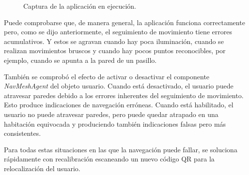 \documentclass{article}
\newenvironment{standalone}{\begin{preview}}{\end{preview}}
\begin{document}
\begin{standalone}
\begin{figure}[ht!]
    \caption{Captura de la aplicación en ejecución.}
    \label{fig:capturas}
  \end{figure}

  Puede comprobarse que, de manera general, la aplicación funciona correctamente pero, como se dijo anteriormente, el seguimiento de movimiento tiene errores acumulativos.
  Y estos se agravan cuando hay poca iluminación, cuando se realizan movimientos bruscos y cuando hay pocos puntos reconocibles, por ejemplo, cuando se apunta a la pared de un pasillo.

  También se comprobó el efecto de activar o desactivar el componente \textit{NavMeshAgent} del objeto usuario.
  Cuando está desactivado, el usuario puede atravesar paredes debido a los errores inherentes del seguimiento de movimiento.
  Esto produce indicaciones de navegación erróneas.
  Cuando está habilitado, el usuario no puede atravesar paredes, pero puede quedar atrapado en una habitación equivocada y produciendo también indicaciones falsas pero más consistentes.

  Para todas estas situaciones en las que la navegación puede fallar, se soluciona rápidamente con recalibración escaneando un nuevo código QR para la relocalización del usuario.

\end{standalone}
\end{document}
